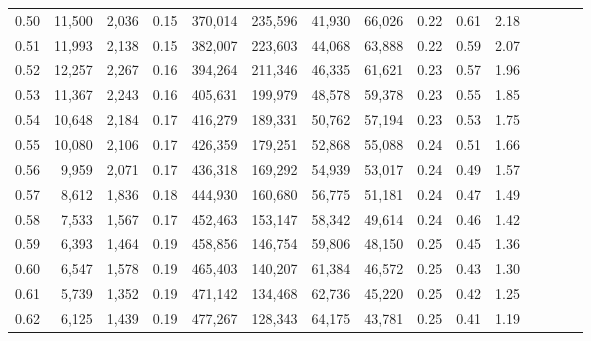 \begin{tabular}{rrrcrrrrrrrrrrr}
0.50 &  11,500 &  2,036 &                                       0.15 &  370,014 &  235,596 &   41,930 &   66,026 &  0.22 &  0.61 &                         2.18 \\
0.51 &  11,993 &  2,138 &                                       0.15 &  382,007 &  223,603 &   44,068 &   63,888 &  0.22 &  0.59 &                         2.07 \\
0.52 &  12,257 &  2,267 &                                       0.16 &  394,264 &  211,346 &   46,335 &   61,621 &  0.23 &  0.57 &                         1.96 \\
0.53 &  11,367 &  2,243 &                                       0.16 &  405,631 &  199,979 &   48,578 &   59,378 &  0.23 &  0.55 &                         1.85 \\
0.54 &  10,648 &  2,184 &                                       0.17 &  416,279 &  189,331 &   50,762 &   57,194 &  0.23 &  0.53 &                         1.75 \\
0.55 &  10,080 &  2,106 &                                       0.17 &  426,359 &  179,251 &   52,868 &   55,088 &  0.24 &  0.51 &                         1.66 \\
0.56 &   9,959 &  2,071 &                                       0.17 &  436,318 &  169,292 &   54,939 &   53,017 &  0.24 &  0.49 &                         1.57 \\
0.57 &   8,612 &  1,836 &                                       0.18 &  444,930 &  160,680 &   56,775 &   51,181 &  0.24 &  0.47 &                         1.49 \\
0.58 &   7,533 &  1,567 &                                       0.17 &  452,463 &  153,147 &   58,342 &   49,614 &  0.24 &  0.46 &                         1.42 \\
0.59 &   6,393 &  1,464 &                                       0.19 &  458,856 &  146,754 &   59,806 &   48,150 &  0.25 &  0.45 &                         1.36 \\
0.60 &   6,547 &  1,578 &                                       0.19 &  465,403 &  140,207 &   61,384 &   46,572 &  0.25 &  0.43 &                         1.30 \\
0.61 &   5,739 &  1,352 &                                       0.19 &  471,142 &  134,468 &   62,736 &   45,220 &  0.25 &  0.42 &                         1.25 \\
0.62 &   6,125 &  1,439 &                                       0.19 &  477,267 &  128,343 &   64,175 &   43,781 &  0.25 &  0.41 &                         1.19 \\

\end{tabular}
